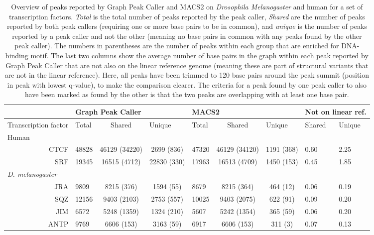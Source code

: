 \documentclass[a4paper,8pt]{article}
\title{}
\author{}
\begin{document}
\begin{table}[!ht]
\begin{adjustwidth}{-1.25in}{0in} %
\centering
\caption{Overview of peaks reported by Graph Peak Caller and MACS2 on \emph{Drosophila Melanogaster} and human for a set of transcription factors. \emph{Total} is the total number of peaks reported by the peak caller, \emph{Shared} are the number of peaks reported by both peak callers (requiring one or more base pairs to be in common), and \emph{unique} is the number of peaks reported by a peak caller and not the other (meaning no base pairs in common with any peaks found by the other peak caller). The numbers in parentheses are the number of peaks within each group that are enriched for DNA-binding motif. The last two columns show the average number of base pairs in the graph within each peak reported by Graph Peak Caller that are not also on the linear reference genome (meaning these are part of structural variants that are not in the linear reference). Here, all peaks have been trimmed to 120 base pairs around the peak summit (position in peak with lowest q-value), to make the comparison clearer. The criteria for a peak found by one peak caller to also have been marked as found by the other is that the two peaks are overlapping with at least one base pair.}
\label{table1}
\begin{tabularx}{1.6\textwidth}{Xbccbccbb}
\toprule
& \multicolumn{3}{|l|}{Graph Peak Caller}  & \multicolumn{3}{l|}{MACS2} & \multicolumn{2}{l}{Not on linear ref.}                                                                                    \\ \midrule
\multicolumn{1}{l|}{Transcription factor} & Total & Shared & \multicolumn{1}{l|}{Unique} & Total & Shared & \multicolumn{1}{l|}{Unique} & Shared & Unique \\ \midrule

\multicolumn{1}{l|}{Human} & \multicolumn{8}{l}{} \\
\multicolumn{1}{r|}{CTCF} & 48828 &46129 (34220)	&2699 (836)	&47320 &46129 (34120) &1191 (368) &0.60	 &2.25\\
\multicolumn{1}{r|}{SRF} &19345	 &16515 (4712)	 &22830 (330)	 &17963 &16513 (4709)	 &1450 (153) &0.45	 &1.85 \\

\multicolumn{1}{l|}{\emph{D. melanogaster}} & \multicolumn{8}{l}{} \\
\multicolumn{1}{r|}{JRA} & 9809 &8215 (376)	 &1594 (55)	 &8679 &8215 (364)	 & 464 (12)	&0.06 &0.19 \\
\multicolumn{1}{r|}{SQZ} & 12156 &9403 (2103)	 &2753 (557)	 & 10025& 9403 (2075)	&622 (91)	 &0.09	 &0.20 \\
\multicolumn{1}{r|}{JIM} &6572  &5248 (1359)	 &1324 (210)	 &5607 &5242 (1354)	 &365 (59)	 & 0.06	& 0.20\\
\multicolumn{1}{r|}{ANTP} & 9769	 &6606 (153)	 & 3163 (59)	&6917	 & 6606 (153)	& 311 (3)	&0.07	 & 0.13\\ \bottomrule
\end{tabularx}
\end{adjustwidth}
\end{table}
\end{document}
